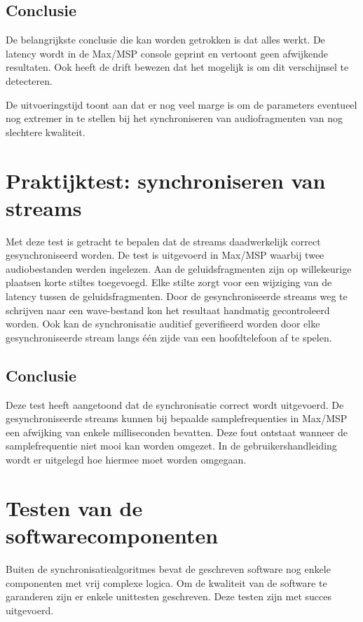 \subsection{Conclusie}

De belangrijkste conclusie die kan worden getrokken is dat alles werkt. De latency wordt in de Max/MSP console geprint en vertoont geen afwijkende resultaten. Ook heeft de drift bewezen dat het mogelijk is om dit verschijnsel te detecteren.

De uitvoeringstijd toont aan dat er nog veel marge is om de parameters eventueel nog extremer in te stellen bij het synchroniseren van audiofragmenten van nog slechtere kwaliteit.

\section{Praktijktest: synchroniseren van streams}

Met deze test is getracht te bepalen dat de streams daadwerkelijk correct gesynchroniseerd worden. De test is uitgevoerd in Max/MSP waarbij twee audiobestanden werden ingelezen. Aan de geluidsfragmenten zijn op willekeurige plaatsen korte stiltes toegevoegd. Elke stilte zorgt voor een wijziging van de latency tussen de geluidsfragmenten. Door de gesynchroniseerde streams weg te schrijven naar een wave-bestand kon het resultaat handmatig gecontroleerd worden. Ook kan de synchronisatie auditief geverifieerd worden door elke gesynchroniseerde stream langs één zijde van een hoofdtelefoon af te spelen.

\subsection{Conclusie}

Deze test heeft aangetoond dat de synchronisatie correct wordt uitgevoerd. De gesynchroniseerde streams kunnen bij bepaalde samplefrequenties in Max/MSP een afwijking van enkele milliseconden bevatten. Deze fout ontstaat wanneer de samplefrequentie niet mooi kan worden omgezet. In de gebruikershandleiding wordt er uitgelegd hoe hiermee moet worden omgegaan.

\section{Testen van de softwarecomponenten}

Buiten de synchronisatiealgoritmes bevat de geschreven software nog enkele componenten met vrij complexe logica. Om de kwaliteit van de software te garanderen zijn er enkele unittesten geschreven. Deze testen zijn met succes uitgevoerd.

